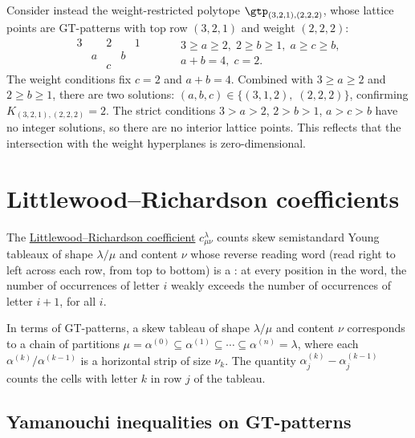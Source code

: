 \begin{example*}
Consider instead the weight-restricted polytope
$\gtp_{(3,2,1),(2,2,2)}$, whose lattice points are
GT-patterns with top row $(3,2,1)$ and weight $(2,2,2)$:
\[
\begin{matrix}
3 && 2 && 1 \\
& a && b \\
&& c
\end{matrix}
\qquad
\begin{aligned}
& 3 \geq a \geq 2,\; 2 \geq b \geq 1,\; a \geq c \geq b, \\
& a + b = 4,\; c = 2.
\end{aligned}
\]
The weight conditions fix $c=2$ and $a+b=4$.
Combined with $3 \geq a \geq 2$ and $2 \geq b \geq 1$,
there are two solutions: $(a,b,c) \in \{(3,1,2),\; (2,2,2)\}$,
confirming $K_{(3,2,1),(2,2,2)} = 2$.
The strict conditions $3 > a > 2$, $2 > b > 1$, $a > c > b$
have no integer solutions, so there are no interior lattice points.
This reflects that the intersection with the weight hyperplanes is
zero-dimensional.
\end{example*}



\section[gtLR]{Littlewood--Richardson coefficients}

The \hyperref[lrTableaux]{Littlewood--Richardson coefficient} $c^\lambda_{\mu\nu}$
counts skew semistandard Young tableaux of shape $\lambda/\mu$
and content $\nu$ whose reverse reading word
(read right to left across each row, from top to bottom)
is a \label{latticeWord}:
at every position in the word, the number of occurrences of letter $i$
weakly exceeds the number of occurrences of letter $i+1$, for all $i$.

In terms of GT-patterns, a skew tableau of shape $\lambda/\mu$ and content $\nu$
corresponds to a chain of partitions
$\mu = \alpha^{(0)} \subseteq \alpha^{(1)}
\subseteq \dotsb \subseteq \alpha^{(n)} = \lambda$,
where each $\alpha^{(k)}/\alpha^{(k-1)}$ is a horizontal strip of size $\nu_k$.
The quantity $\alpha^{(k)}_j - \alpha^{(k-1)}_j$ counts the cells with
letter $k$ in row $j$ of the tableau.


\subsection[gtLRInequalities]{Yamanouchi inequalities on GT-patterns}

